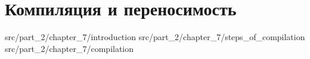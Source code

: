 \chapter{Компиляция и переносимость}
\label{chpt:compilation_and_portability}

 {src/part_2/chapter_7/introduction}
 {src/part_2/chapter_7/steps_of_compilation}
 {src/part_2/chapter_7/compilation}
